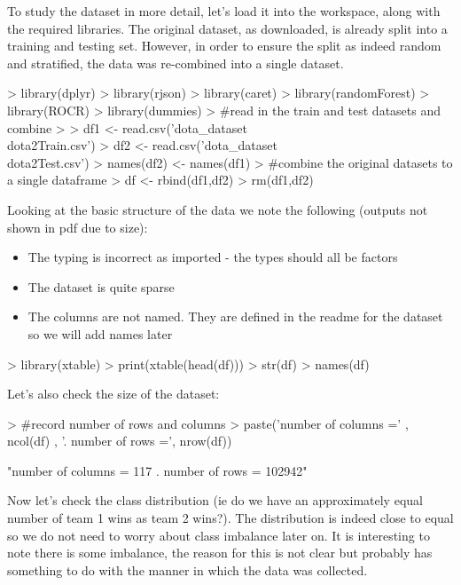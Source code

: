 \documentclass[10pt]{article}
\begin{document}
To study the dataset in more detail, let's load it into the workspace, along with the required libraries. The original dataset, as downloaded, is already split into a training and testing set. However, in order to ensure the split as indeed random and stratified, the data was re-combined into a single dataset.
\hspace{1cm} 

\begin{Schunk}
\begin{Sinput}
> library(dplyr)
> library(rjson)
> library(caret)
> library(randomForest)
> library(ROCR)
> library(dummies)
> #read in the train and test datasets and combine 
> 
> df1 <- read.csv('dota_dataset\\dota2Train.csv')
> df2 <- read.csv('dota_dataset\\dota2Test.csv')
> names(df2) <- names(df1)
> #combine the original datasets to a single dataframe
> df <- rbind(df1,df2)
> rm(df1,df2)
\end{Sinput}
\end{Schunk}

\hspace{1cm} 

Looking at the basic structure of the data we note the following (outputs not shown in pdf due to size):
 
\begin{itemize}
  \item The typing is incorrect as imported - the types should all be factors
  \item The dataset is quite sparse
  \item The columns are not named. They are defined in the readme for the dataset so we will add names later
\end{itemize}
\hspace{1cm} 

\begin{Schunk}
\begin{Sinput}
> library(xtable)
> print(xtable(head(df)))
> str(df)
> names(df)
\end{Sinput}
\end{Schunk}
Let's also check the size of the dataset:
\begin{Schunk}
\begin{Sinput}
> #record number of rows and columns
> paste('number of columns =' , ncol(df) , '. number of rows =', nrow(df))
\end{Sinput}
\begin{Soutput}
[1] "number of columns = 117 . number of rows = 102942"
\end{Soutput}
\end{Schunk}
\hspace{1cm} 
Now let's check the class distribution (ie do we have an approximately equal number of team 1 wins as team 2 wins?).
The distribution is indeed close to equal so we do not need to worry about class imbalance later on. It is interesting to note there is some imbalance, the reason for this is not clear but probably has something to do with the manner in which the data was collected.
\end{document}
